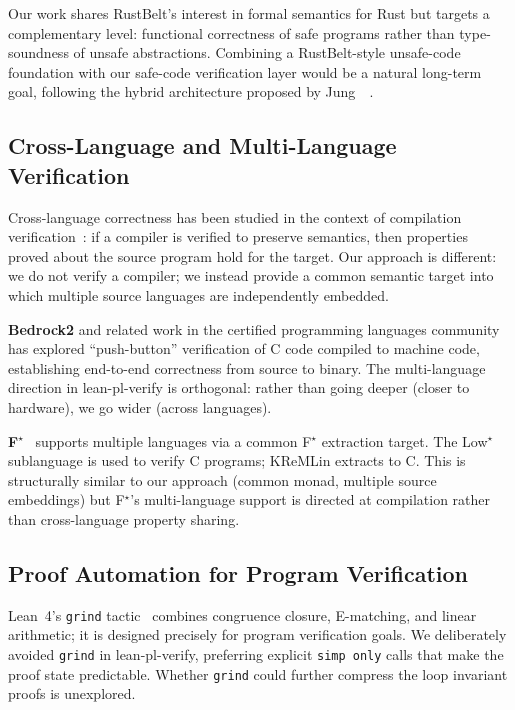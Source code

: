 Our work shares RustBelt's interest in formal semantics for Rust but
targets a complementary level: functional correctness of safe programs
rather than type-soundness of unsafe abstractions. Combining a
RustBelt-style unsafe-code foundation with our safe-code verification
layer would be a natural long-term goal, following the hybrid architecture
proposed by Jung~\etal~\cite{rustbelt2018}.

\subsection{Cross-Language and Multi-Language Verification}

Cross-language correctness has been studied in the context of compilation
verification~\cite{compcert2009}: if a compiler is verified to preserve
semantics, then properties proved about the source program hold for the
target. Our approach is different: we do not verify a compiler; we instead
provide a common semantic target into which multiple source languages are
independently embedded.

\textbf{Bedrock2} and related work in the certified programming languages
community has explored ``push-button'' verification of C code compiled to
machine code, establishing end-to-end correctness from source to binary.
The multi-language direction in lean-pl-verify is orthogonal: rather than
going deeper (closer to hardware), we go wider (across languages).

\textbf{F$^\star$}~\cite{fstar2016} supports multiple languages via a
common F$^\star$ extraction target. The Low$^\star$ sublanguage is used
to verify C programs; KReMLin extracts to C. This is structurally similar
to our approach (common monad, multiple source embeddings) but F$^\star$'s
multi-language support is directed at compilation rather than cross-language
property sharing.

\subsection{Proof Automation for Program Verification}

Lean~4's \texttt{grind} tactic~\cite{lean4} combines congruence closure,
E-matching, and linear arithmetic; it is designed precisely for program
verification goals. We deliberately avoided \texttt{grind} in lean-pl-verify,
preferring explicit \texttt{simp only} calls that make the proof state
predictable. Whether \texttt{grind} could further compress the loop invariant
proofs is unexplored.

